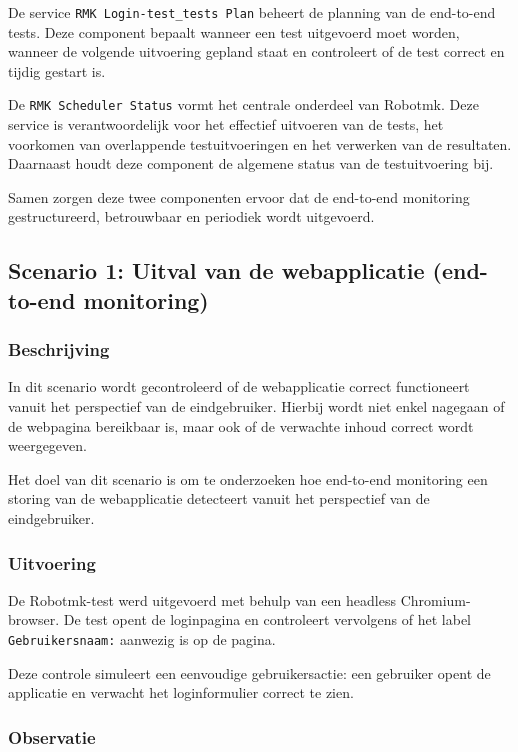 De service \texttt{RMK Login-test\_tests Plan} beheert de planning van de end-to-end tests. Deze component bepaalt wanneer een test uitgevoerd moet worden, wanneer de volgende uitvoering gepland staat en controleert of de test correct en tijdig gestart is.

De \texttt{RMK Scheduler Status} vormt het centrale onderdeel van Robotmk. Deze service is verantwoordelijk voor het effectief uitvoeren van de tests, het voorkomen van overlappende testuitvoeringen en het verwerken van de resultaten. Daarnaast houdt deze component de algemene status van de testuitvoering bij.

Samen zorgen deze twee componenten ervoor dat de end-to-end monitoring gestructureerd, betrouwbaar en periodiek wordt uitgevoerd.

\subsection{Scenario 1: Uitval van de webapplicatie (end-to-end monitoring)}

\subsubsection{Beschrijving}

In dit scenario wordt gecontroleerd of de webapplicatie correct functioneert vanuit het perspectief van de eindgebruiker. Hierbij wordt niet enkel nagegaan of de webpagina bereikbaar is, maar ook of de verwachte inhoud correct wordt weergegeven.

Het doel van dit scenario is om te onderzoeken hoe end-to-end monitoring een storing van de webapplicatie detecteert vanuit het perspectief van de eindgebruiker.

\subsubsection{Uitvoering}

De Robotmk-test werd uitgevoerd met behulp van een headless Chromium-browser. De test opent de loginpagina en controleert vervolgens of het label \texttt{Gebruikersnaam:} aanwezig is op de pagina.

Deze controle simuleert een eenvoudige gebruikersactie: een gebruiker opent de applicatie en verwacht het loginformulier correct te zien.

\subsubsection{Observatie}

